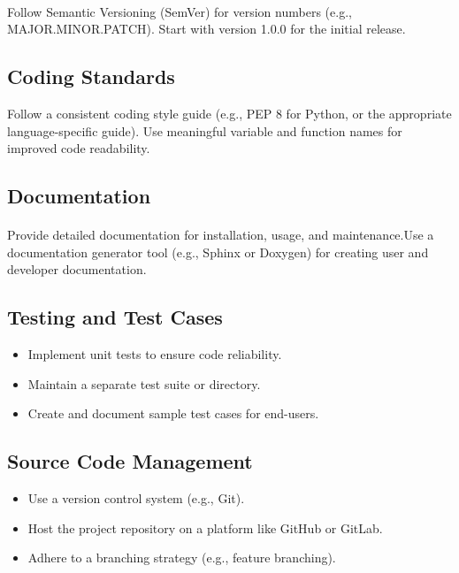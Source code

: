 \documentclass{article}
\begin{document}
\paragraph{}
Follow Semantic Versioning (SemVer) for version numbers (e.g., MAJOR.MINOR.PATCH).
Start with version 1.0.0 for the initial release.

\subsection{Coding Standards}
Follow a consistent coding style guide (e.g., PEP 8 for Python, or the appropriate
language-specific guide). Use meaningful variable and function names for improved
code readability.

\subsection{Documentation}
\paragraph{}
Provide detailed documentation for installation, usage, and maintenance.Use a
documentation generator tool (e.g., Sphinx or Doxygen) for creating user and developer
documentation.

\subsection{Testing and Test Cases}
\begin{itemize}
    \item Implement unit tests to ensure code reliability.
    \item Maintain a separate test suite or directory.
    \item Create and document sample test cases for end-users.
\end{itemize}

\subsection{Source Code Management}
\begin{itemize}
    \item Use a version control system (e.g., Git).
    \item Host the project repository on a platform like GitHub or GitLab.
    \item Adhere to a branching strategy (e.g., feature branching).
\end{itemize}
\end{document}
